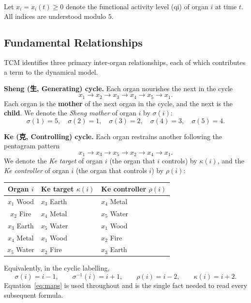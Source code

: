 \documentclass[11pt]{article}
\begin{document}
Let $x_i = x_i(t) \geq 0$ denote the functional activity level (qi) of organ $i$
at time $t$. All indices are understood modulo $5$.

\subsection{Fundamental Relationships}

TCM identifies three primary inter-organ relationships, each of which
contributes a term to the dynamical model.

\medskip
\noindent\textbf{Sheng (生, Generating) cycle.}
Each organ nourishes the next in the cycle
\[
x_1 \to x_2 \to x_3 \to x_4 \to x_5 \to x_1 .
\]
Each organ is the \textbf{mother} of the next organ in the cycle, and the next
is the \textbf{child}. We denote the \emph{Sheng mother} of organ $i$ by
$\sigma(i)$:
\[
\sigma(1)=5,\quad \sigma(2)=1,\quad \sigma(3)=2,\quad \sigma(4)=3,\quad \sigma(5)=4 .
\]

\medskip
\noindent\textbf{Ke (克, Controlling) cycle.}
Each organ restrains another following the pentagram pattern
\[
x_1 \to x_3 \to x_5 \to x_2 \to x_4 \to x_1 .
\]
We denote the \emph{Ke target} of organ $i$ (the organ that $i$ controls) by
$\kappa(i)$, and the \emph{Ke controller} of organ $i$ (the organ that controls
$i$) by $\rho(i)$:

\begin{center}
\begin{tabular}{cll}
\toprule
Organ $i$ & Ke target $\kappa(i)$ & Ke controller $\rho(i)$ \\
\midrule
$x_1$ Wood  & $x_3$ Earth  & $x_4$ Metal  \\
$x_2$ Fire  & $x_4$ Metal  & $x_5$ Water  \\
$x_3$ Earth & $x_5$ Water  & $x_1$ Wood   \\
$x_4$ Metal & $x_1$ Wood   & $x_2$ Fire   \\
$x_5$ Water & $x_2$ Fire   & $x_3$ Earth  \\
\bottomrule
\end{tabular}
\end{center}

Equivalently, in the cyclic labelling,
\begin{equation}\label{eq:maps}
\sigma(i)=i-1,\qquad \sigma^{-1}(i)=i+1,\qquad \rho(i)=i-2,\qquad \kappa(i)=i+2 .
\end{equation}
Equation~\eqref{eq:maps} is used throughout and is the single fact needed to read
every subsequent formula.
\end{document}

